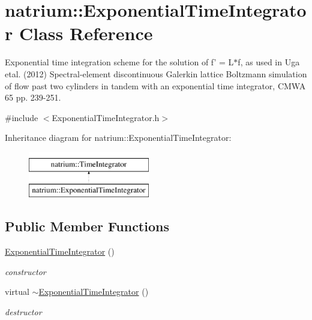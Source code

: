 \hypertarget{classnatrium_1_1ExponentialTimeIntegrator}{\section{natrium\-:\-:\-Exponential\-Time\-Integrator \-Class \-Reference}
\label{classnatrium_1_1ExponentialTimeIntegrator}
}


\-Exponential time integration scheme for the solution of f' = \-L$\ast$f, as used in \-Uga etal. (2012) \-Spectral-\/element discontinuous \-Galerkin lattice \-Boltzmann simulation of flow past two cylinders in tandem with an exponential time integrator, \-C\-M\-W\-A 65 pp. 239-\/251.  




{\ttfamily \#include $<$\-Exponential\-Time\-Integrator.\-h$>$}

\-Inheritance diagram for natrium\-:\-:\-Exponential\-Time\-Integrator\-:\begin{figure}[H]
\begin{center}
\leavevmode
\includegraphics[height=2.000000cm]{classnatrium_1_1ExponentialTimeIntegrator}
\end{center}
\end{figure}
\subsection*{\-Public \-Member \-Functions}
\begin{DoxyCompactItemize}
\item 
\hypertarget{classnatrium_1_1ExponentialTimeIntegrator_a91472d03faddf0e2166fb5d77e6cb062}{\hyperlink{classnatrium_1_1ExponentialTimeIntegrator_a91472d03faddf0e2166fb5d77e6cb062}{\-Exponential\-Time\-Integrator} ()}\label{classnatrium_1_1ExponentialTimeIntegrator_a91472d03faddf0e2166fb5d77e6cb062}

\begin{DoxyCompactList}\small\item\em constructor \end{DoxyCompactList}\item 
\hypertarget{classnatrium_1_1ExponentialTimeIntegrator_a7114f9845feb896b3129492de36a60b3}{virtual \hyperlink{classnatrium_1_1ExponentialTimeIntegrator_a7114f9845feb896b3129492de36a60b3}{$\sim$\-Exponential\-Time\-Integrator} ()}\label{classnatrium_1_1ExponentialTimeIntegrator_a7114f9845feb896b3129492de36a60b3}

\begin{DoxyCompactList}\small\item\em destructor \end{DoxyCompactList}\end{DoxyCompactItemize}


